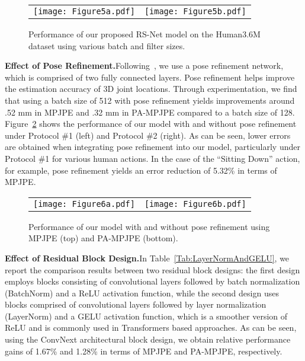\documentclass[10pt,journal]{IEEEtran}
\begin{document}
\begin{figure}[!htb]
\centering
\setlength{\tabcolsep}{1pt}
\begin{tabular}{cc}
\texttt{[image: Figure5a.pdf]} & \texttt{[image: Figure5b.pdf]}
\end{tabular}
\caption{Performance of our proposed RS-Net model on the Human3.6M dataset using various batch and filter sizes.}
\label{Fig:BatchAndFilter}
\end{figure}

\medskip\noindent\textbf{Effect of Pose Refinement.}\quad Following~\cite{YujunCai:19}, we use a pose refinement network, which is comprised of two fully connected layers. Pose refinement helps improve the estimation accuracy of 3D joint locations. Through experimentation, we find that using a batch size of 512 with pose refinement yields improvements around .52 mm in MPJPE and .32 mm in PA-MPJPE compared to a batch size of 128. Figure~\ref{Fig:post_refine} shows the performance of our model with and without pose refinement under Protocol \#1 (left) and Protocol \#2 (right). As can be seen, lower errors are obtained when integrating pose refinement into our model, particularly under Protocol \#1 for various human actions. In the case of the ``Sitting Down'' action, for example, pose refinement yields an error reduction of 5.32\% in terms of MPJPE.
	
\begin{figure}[!htb]
\centering
\setlength{\tabcolsep}{1pt}
\begin{tabular}{cc}
\texttt{[image: Figure6a.pdf]} & \texttt{[image: Figure6b.pdf]}
\end{tabular}
\caption{Performance of our model with and without pose refinement using MPJPE (top) and PA-MPJPE (bottom).}
\label{Fig:post_refine}
\end{figure}

\medskip\noindent\textbf{Effect of Residual Block Design.}\quad In Table~\ref{Tab:LayerNormAndGELU}, we report the comparison results between two residual block designs: the first design employs blocks consisting of convolutional layers followed by batch normalization (BatchNorm) and a ReLU activation function, while the second design uses blocks comprised of convolutional layers followed by layer normalization (LayerNorm) and a GELU activation function, which is a smoother version of ReLU and is commonly used in Transformers based approaches. As can be seen, using the ConvNext architectural block design, we obtain relative performance gains of 1.67\% and 1.28\% in terms of MPJPE and PA-MPJPE, respectively.
\end{document}
